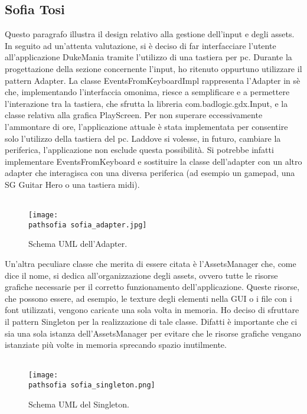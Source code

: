 \documentclass[a4paper,12pt]{report}
\newcommand\pathsofia{img/sofia/}
\begin{document}
\subsection{Sofia Tosi}
Questo paragrafo illustra il design relativo alla gestione dell'input e degli assets.
In seguito ad un'attenta valutazione, si è deciso di far interfacciare l'utente all'applicazione DukeMania tramite l'utilizzo di
una tastiera per pc. 
Durante la progettazione della sezione concernente l'input, ho ritenuto oppurtuno utilizzare il pattern Adapter.
La classe EventsFromKeyboardImpl rappresenta l'Adapter in sè che, implementando l'interfaccia omonima, riesce a semplificare e a permettere l'interazione
tra la tastiera, che sfrutta la libreria com.badlogic.gdx.Input, e la classe relativa alla grafica PlayScreen.
Per non superare eccessivamente l'ammontare di ore, l'applicazione attuale è stata implementata per consentire solo l'utilizzo della tastiera del pc. 
Laddove si volesse, in futuro, cambiare la periferica, l'applicazione non esclude questa possibilità. Si potrebbe infatti implementare EventsFromKeyboard 
e sostituire la classe dell'adapter con un altro adapter che interagisca con una diversa periferica (ad esempio un gamepad, una SG Guitar Hero o una tastiera midi). \\ \\
\newline
\begin{figure}[!htb]
	\centerline{\texttt{[image: \\pathsofia sofia\_adapter.jpg]}}
	\caption{Schema UML dell'Adapter.}
	\label{img:adapter}
\end{figure}
\clearpage \hfill\break
Un'altra peculiare classe che merita di essere citata è l'AssetsManager che, come dice il nome, si dedica all'organizzazione degli assets, ovvero tutte le risorse grafiche
necessarie per il corretto funzionamento dell'applicazione. Queste risorse, che possono essere, ad esempio, le texture degli elementi nella GUI o i file con i font utilizzati,
vengono caricate una sola volta in memoria.
Ho deciso di sfruttare il pattern Singleton per la realizzazione di tale classe. Difatti è importante che ci sia una sola istanza dell'AssetsManager per evitare che le risorse 
grafiche vengano istanziate più volte in memoria sprecando spazio inutilmente. \\ \\
\newline
\begin{figure}[!htb]
	\centerline{\texttt{[image: \\pathsofia sofia\_singleton.png]}}
	\caption{Schema UML del Singleton.}
	\label{img:singleton}
\end{figure}
\clearpage \hfill\break
\end{document}

